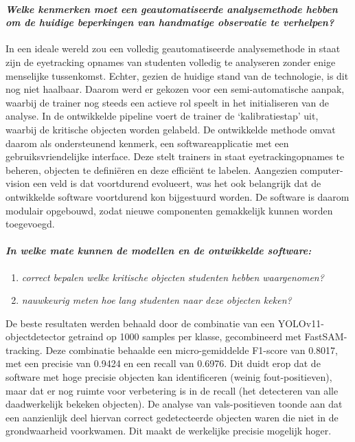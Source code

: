 \paragraph{\textit{Welke kenmerken moet een geautomatiseerde analysemethode hebben om de huidige beperkingen van handmatige observatie te verhelpen?}}
In een ideale wereld zou een volledig geautomatiseerde analysemethode in staat zijn  
de eyetracking opnames van studenten volledig te analyseren zonder enige menselijke tussenkomst.
Echter, gezien de huidige stand van de technologie, is dit nog niet haalbaar.
Daarom werd er gekozen voor een semi-automatische aanpak, waarbij de trainer nog steeds een actieve rol speelt in het initialiseren van de analyse.
In de ontwikkelde pipeline voert de trainer de `kalibratiestap' uit, waarbij de kritische objecten worden gelabeld. 
De ontwikkelde methode omvat daarom als ondersteunend kenmerk, een softwareapplicatie met een gebruiksvriendelijke interface. 
Deze stelt trainers in staat eyetrackingopnames te beheren, objecten te definiëren en deze efficiënt te labelen.
Aangezien computer-vision een veld is dat voortdurend evolueert, was het ook belangrijk dat de ontwikkelde software voortdurend kon bijgestuurd worden.
De software is daarom modulair opgebouwd, zodat nieuwe componenten gemakkelijk kunnen worden toegevoegd.

\paragraph{\textit{In welke mate kunnen de modellen en de ontwikkelde software:}}
\begin{enumerate}
    \item \textit{correct bepalen welke kritische objecten studenten hebben waargenomen?}
    \item \textit{nauwkeurig meten hoe lang studenten naar deze objecten keken?}
\end{enumerate}
De beste resultaten werden behaald door de combinatie van een YOLOv11-object\-detector getraind op 1000 samples per klasse, gecombineerd met FastSAM-tra\-cking.
Deze combinatie behaalde een micro-gemiddelde F1-score van 0.8017, met een precisie van 0.9424 en een recall van 0.6976.
Dit duidt erop dat de software met hoge precisie objecten kan identificeren (weinig fout-positieven), 
maar dat er nog ruimte voor verbetering is in de recall (het detecteren van alle daadwerkelijk bekeken objecten). 
De analyse van vals-positieven toonde aan dat een aanzienlijk deel hiervan correct gedetecteerde objecten waren 
die niet in de grondwaarheid voorkwamen. Dit maakt de werkelijke precisie mogelijk hoger.

